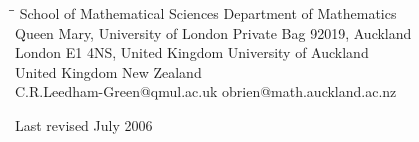 \documentclass[12pt]{article}
\begin{document}
\begin{tabbing}
\=\hspace{70mm}\=\kill
\>School of Mathematical Sciences \>Department of Mathematics    \\
\>Queen Mary, University of London \>Private Bag 92019, Auckland \\
\>London E1 4NS, United Kingdom   \>University of Auckland     \\
\>United Kingdom                  \> New Zealand     \\
\> C.R.Leedham-Green@qmul.ac.uk   \> obrien@math.auckland.ac.nz
\end{tabbing}

\vspace*{2mm}
\noindent 
Last revised July 2006
\end{document}
